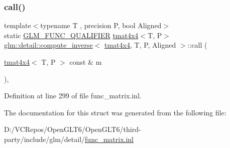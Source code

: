 \subsubsection{\texorpdfstring{call()}{call()}}
{\footnotesize\ttfamily template$<$typename T , precision P, bool Aligned$>$ \\
static \mbox{\hyperlink{setup_8hpp_a33fdea6f91c5f834105f7415e2a64407}{G\+L\+M\+\_\+\+F\+U\+N\+C\+\_\+\+Q\+U\+A\+L\+I\+F\+I\+ER}} \mbox{\hyperlink{structglm_1_1tmat4x4}{tmat4x4}}$<$T, P$>$ \mbox{\hyperlink{structglm_1_1detail_1_1compute__inverse}{glm\+::detail\+::compute\+\_\+inverse}}$<$ \mbox{\hyperlink{structglm_1_1tmat4x4}{tmat4x4}}, T, P, Aligned $>$\+::call (\begin{DoxyParamCaption}\item[{\mbox{\hyperlink{structglm_1_1tmat4x4}{tmat4x4}}$<$ T, P $>$ const \&}]{m }\end{DoxyParamCaption})\hspace{0.3cm}{\ttfamily [inline]}, {\ttfamily [static]}}



Definition at line 299 of file func\+\_\+matrix.\+inl.



The documentation for this struct was generated from the following file\+:\begin{DoxyCompactItemize}
\item 
D\+:/\+V\+C\+Repos/\+Open\+G\+L\+T6/\+Open\+G\+L\+T6/third-\/party/include/glm/detail/\mbox{\hyperlink{func__matrix_8inl}{func\+\_\+matrix.\+inl}}\end{DoxyCompactItemize}
